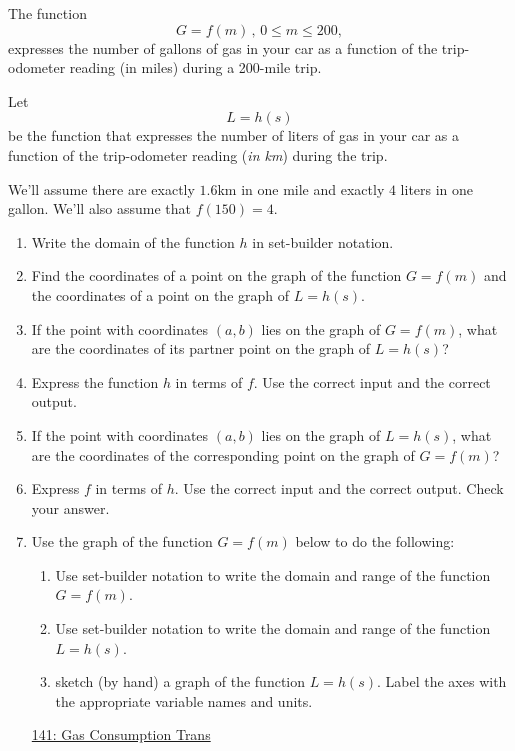 \documentclass{ximera}
\begin{document}
\begin{question} \label{QKdfm3re32}
The function
\[
       G = f(m) \, , \, 0\leq m \leq 200 ,
\]
expresses the number of gallons of gas in your car as a function of the trip-odometer reading (in miles) during a 200-mile trip.

Let 
\[
    L = h(s)
\]
be the function that expresses the number of liters of gas in your car as a function of the trip-odometer reading (\emph{in km}) during the trip.

We'll assume there are exactly $1.6$km in one mile and exactly $4$ liters in one gallon. We'll also assume that $f(150) = 4$.

\begin{enumerate}
\item Write the domain of the function $h$ in set-builder notation.

\item Find the coordinates of a point on the graph of the function $G=f(m)$ and the coordinates of a point on the graph of  $L=h(s)$.

\item If the point with coordinates $(a,b)$ lies on the graph of $G=f(m)$, what are the coordinates of its partner point on the graph of $L=h(s)$?

\item Express the function $h$ in terms of $f$. Use the correct input and the correct output.

\item If the point with coordinates $(a,b)$ lies on the graph of $L=h(s)$, what are the coordinates of the corresponding point on the graph of $G=f(m)$?

\item Express $f$ in terms of $h$. Use the correct input and the correct output. Check your answer.

\item Use the graph of the function $G=f(m)$ below to do the following:

\begin{enumerate}
\item Use set-builder notation to write the domain and range of the function $G=f(m)$.

\item Use set-builder notation to write the domain and range of the function $L=h(s)$.

\item sketch (by hand) a graph of the function $L=h(s)$. Label the axes with the appropriate variable names and units.

\end{enumerate}

\begin{onlineOnly}
    \begin{center}
\end{center}
\end{onlineOnly}

\href{https://www.desmos.com/calculator/nh0w4bcvby}{141: Gas Consumption Trans}
\end{enumerate}
\end{question}
\end{document}
